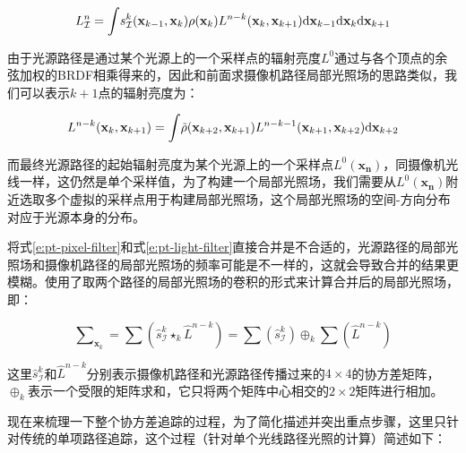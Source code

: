 \begin{equation}
	L^{n}_\mathcal{I}={\rm \int} s^{k}_{\mathcal{I}}(\mathbf{x}_{k-1},\mathbf{x}_k)\rho (\mathbf{x}_k)L^{n-k}(\mathbf{x}_{k},\mathbf{x}_{k+1}){\rm d}\mathbf{x}_{k-1}{\rm d}\mathbf{x}_{k}{\rm d}\mathbf{x}_{k+1}
\end{equation}

由于光源路径是通过某个光源上的一个采样点的辐射亮度$L^{0}$通过与各个顶点的余弦加权的BRDF相乘得来的，因此和前面求摄像机路径局部光照场的思路类似，我们可以表示$k+1$点的辐射亮度为：

\begin{equation}\label{e:pt-light-filter}
\begin{aligned}
	L^{n-k}(\mathbf{x}_{k},\mathbf{x}_{k+1})={\rm \int} \tilde{\rho}(\mathbf{x}_{k+2},\mathbf{x}_{k+1})  L^{n-k-1}(\mathbf{x}_{k+1},\mathbf{x}_{k+2}){\rm d}\mathbf{x}_{k+2}
\end{aligned}
\end{equation}

而最终光源路径的起始辐射亮度为某个光源上的一个采样点$L^{0}(\mathbf{x_n})$，同摄像机光线一样，这仍然是单个采样值，为了构建一个局部光照场，我们需要从$L^{0}(\mathbf{x_n})$附近选取多个虚拟的采样点用于构建局部光照场，这个局部光照场的空间-方向分布对应于光源本身的分布。

将式\ref{e:pt-pixel-filter}和式\ref{e:pt-light-filter}直接合并是不合适的，光源路径的局部光照场和摄像机路径的局部光照场的频率可能是不一样的，这就会导致合并的结果更模糊。\cite{a:AntialiasingComplexGlobalIlluminationEffectsinPath-space}使用了取两个路径的局部光照场的卷积的形式来计算合并后的局部光照场，即：

\begin{equation}
	\sum\nolimits_{\mathbf{x}_k}=\sum (\hat{s}^{k}_{\mathcal{I}}\star_k \hat{L}^{n-k})=\sum(\hat{s}^{k}_{\mathcal{I}})\oplus_k\sum(\hat{L}^{n-k})
\end{equation}

\noindent 这里$\hat{s}^{k}_{\mathcal{I}}$和$\hat{L}^{n-k}$分别表示摄像机路径和光源路径传播过来的$4\times 4$的协方差矩阵，$\oplus_k$表示一个受限的矩阵求和，它只将两个矩阵中心相交的$2\times 2$矩阵进行相加。

现在来梳理一下整个协方差追踪的过程，为了简化描述并突出重点步骤，这里只针对传统的单项路径追踪，这个过程（针对单个光线路径光照的计算）简述如下：

